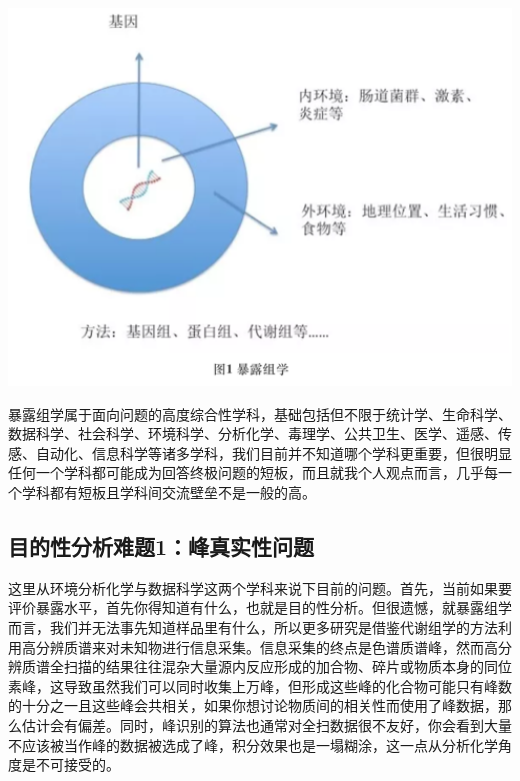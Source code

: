 \documentclass[
]{book}
\begin{document}
\includegraphics[width=6.67in]{images/expo1}

暴露组学属于面向问题的高度综合性学科，基础包括但不限于统计学、生命科学、数据科学、社会科学、环境科学、分析化学、毒理学、公共卫生、医学、遥感、传感、自动化、信息科学等诸多学科，我们目前并不知道哪个学科更重要，但很明显任何一个学科都可能成为回答终极问题的短板，而且就我个人观点而言，几乎每一个学科都有短板且学科间交流壁垒不是一般的高。

\hypertarget{ux76eeux7684ux6027ux5206ux6790ux96beux98981ux5cf0ux771fux5b9eux6027ux95eeux9898}{%
\subsection{目的性分析难题1：峰真实性问题}\label{ux76eeux7684ux6027ux5206ux6790ux96beux98981ux5cf0ux771fux5b9eux6027ux95eeux9898}}

这里从环境分析化学与数据科学这两个学科来说下目前的问题。首先，当前如果要评价暴露水平，首先你得知道有什么，也就是目的性分析。但很遗憾，就暴露组学而言，我们并无法事先知道样品里有什么，所以更多研究是借鉴代谢组学的方法利用高分辨质谱来对未知物进行信息采集。信息采集的终点是色谱质谱峰，然而高分辨质谱全扫描的结果往往混杂大量源内反应形成的加合物、碎片或物质本身的同位素峰，这导致虽然我们可以同时收集上万峰，但形成这些峰的化合物可能只有峰数的十分之一且这些峰会共相关，如果你想讨论物质间的相关性而使用了峰数据，那么估计会有偏差。同时，峰识别的算法也通常对全扫数据很不友好，你会看到大量不应该被当作峰的数据被选成了峰，积分效果也是一塌糊涂，这一点从分析化学角度是不可接受的。
\end{document}
